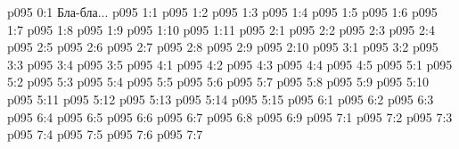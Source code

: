 \author{Мелхиседек}
\vs p095 0:1  Бла-бла...
\vs p095 1:1 
\vs p095 1:2 
\vs p095 1:3 
\vs p095 1:4 
\vs p095 1:5 
\vs p095 1:6 \pc 
\vs p095 1:7 
\vs p095 1:8 
\vs p095 1:9 
\vs p095 1:10 \pc 
\vs p095 1:11 
\vs p095 2:1 
\vs p095 2:2 
\vs p095 2:3 
\vs p095 2:4 \pc 
\vs p095 2:5 
\vs p095 2:6 \pc 
\vs p095 2:7 \pc 
\vs p095 2:8 
\vs p095 2:9 
\vs p095 2:10 
\vs p095 3:1 
\vs p095 3:2 
\vs p095 3:3 
\vs p095 3:4 
\vs p095 3:5 \pc 
{}
\vs p095 4:1 
\vs p095 4:2 
\vs p095 4:3 
\vs p095 4:4 
\vs p095 4:5 \pc 
{}
\vs p095 5:1 
\vs p095 5:2 
\vs p095 5:3 
\vs p095 5:4 
\vs p095 5:5 
\vs p095 5:6 
\vs p095 5:7 
\vs p095 5:8 \pc 
\vs p095 5:9 
\vs p095 5:10 \pc 
\vs p095 5:11 
\vs p095 5:12 
\vs p095 5:13 
\vs p095 5:14 \pc 
\vs p095 5:15 
\vs p095 6:1 
\vs p095 6:2 
\vs p095 6:3 
\vs p095 6:4 
\vs p095 6:5 \pc 
\vs p095 6:6 
\vs p095 6:7 
\vs p095 6:8 \pc 
\vs p095 6:9 
\vs p095 7:1 
\vs p095 7:2 
\vs p095 7:3 
\vs p095 7:4 
\vs p095 7:5 
\vs p095 7:6 
\vsetoff
\vs p095 7:7 
\quizlink
